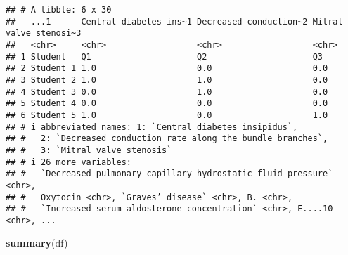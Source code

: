 \documentclass[
]{article}
\newenvironment{Shaded}{\begin{snugshade}}{\end{snugshade}}
\newcommand{\FunctionTok}[1]{\textcolor[rgb]{0.13,0.29,0.53}{\textbf{#1}}}
\newcommand{\NormalTok}[1]{#1}
\begin{document}
\begin{verbatim}
## # A tibble: 6 x 30
##   ...1      Central diabetes ins~1 Decreased conduction~2 Mitral valve stenosi~3
##   <chr>     <chr>                  <chr>                  <chr>                 
## 1 Student   Q1                     Q2                     Q3                    
## 2 Student 1 1.0                    0.0                    0.0                   
## 3 Student 2 1.0                    1.0                    0.0                   
## 4 Student 3 0.0                    1.0                    0.0                   
## 5 Student 4 0.0                    0.0                    0.0                   
## 6 Student 5 1.0                    0.0                    1.0                   
## # i abbreviated names: 1: `Central diabetes insipidus`,
## #   2: `Decreased conduction rate along the bundle branches`,
## #   3: `Mitral valve stenosis`
## # i 26 more variables:
## #   `Decreased pulmonary capillary hydrostatic fluid pressure` <chr>,
## #   Oxytocin <chr>, `Graves’ disease` <chr>, B. <chr>,
## #   `Increased serum aldosterone concentration` <chr>, E....10 <chr>, ...
\end{verbatim}

\begin{Shaded}
\begin{Highlighting}[]
\FunctionTok{summary}\NormalTok{(df)}
\end{Highlighting}
\end{Shaded}
\end{document}
